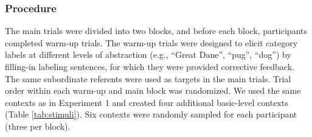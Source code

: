 \documentclass[a4paper,man,natbib]{apa6}
\begin{document}
\subsubsection{Procedure}
The main trials were divided into two blocks, and before each block, participants completed warm-up trials. The warm-up trials were designed to elicit category labels at different levels of abstraction (e.g., ``Great Dane'', ``pug'', ``dog'') by filling-in labeling sentences, for which they were provided corrective feedback. %
The same subordinate referents were used as targets in the main trials. 
Trial order within each warm-up and main block was randomized. We used the same contexts as in Experiment 1 and created four additional basic-level contexts (Table \ref{tab:stimuli}). 
Six contexts were randomly sampled for each participant (three per block). 
\end{document}
